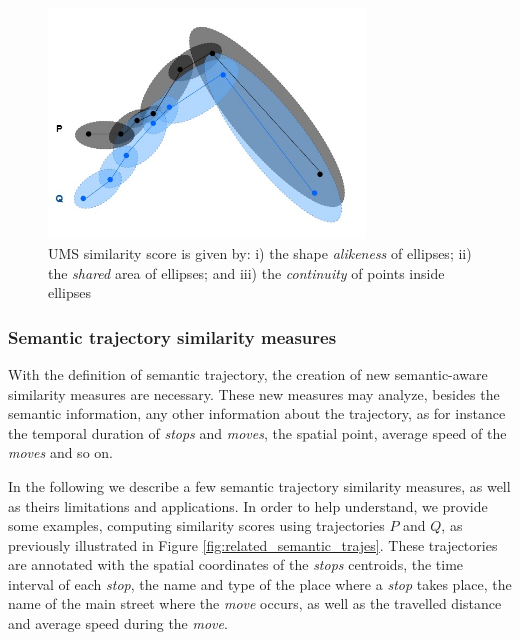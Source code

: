 \documentclass[12pt]{article}
\begin{document}
\begin{figure}[!h]
\centering
\includegraphics[width=0.75\textwidth]{Related_Works/related_trajes-UMS.jpg}
\caption{\label{fig:related_trajes_UMS}UMS similarity score is given by: i) the shape \textit{alikeness} of ellipses; ii) the \textit{shared} area of ellipses; and iii) the \textit{continuity} of points inside ellipses}
\end{figure}

\subsubsection{Semantic trajectory similarity measures} \label{sec:related_semantic}

With the definition of semantic trajectory, the creation of new semantic-aware similarity measures are necessary. These new measures may analyze, besides the semantic information, any other information about the trajectory, as for instance the temporal duration of \emph{stops} and \emph{moves}, the spatial point, average speed of the \emph{moves} and so on.

In the following we describe a few semantic trajectory similarity measures, as well as theirs limitations and applications. In order to help understand, we provide some examples, computing similarity scores using trajectories $P$ and $Q$, as previously illustrated in Figure \ref{fig:related_semantic_trajes}. These trajectories are annotated with the spatial coordinates of the \emph{stops} centroids, the time interval of each \emph{stop}, the name and type of the place where a \emph{stop} takes place, the name of the main street where the \emph{move} occurs, as well as the travelled distance and average speed during the \emph{move}.
\end{document}
